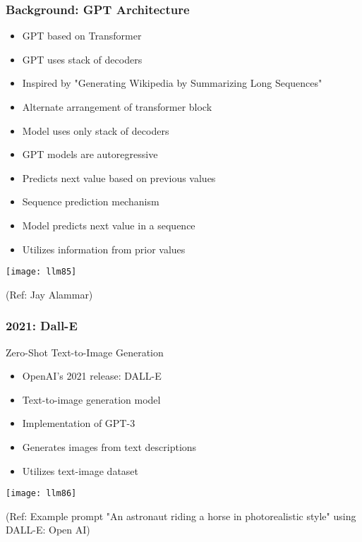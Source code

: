 \begin{frame}[fragile]\frametitle{Background: GPT Architecture}

\begin{itemize}
        \item GPT based on Transformer
        \item GPT uses stack of decoders
        \item Inspired by "Generating Wikipedia by Summarizing Long Sequences"
        \item Alternate arrangement of transformer block
        \item Model uses only stack of decoders
        \item GPT models are autoregressive
        \item Predicts next value based on previous values
        \item Sequence prediction mechanism
        \item Model predicts next value in a sequence
        \item Utilizes information from prior values		
\end{itemize}	

\begin{center}
\texttt{[image: llm85]}
\end{center}		

{\tiny (Ref: Jay Alammar)}

\end{frame}

\begin{frame}[fragile]\frametitle{2021: Dall-E}

 Zero-Shot Text-to-Image Generation
 
\begin{itemize}
        \item OpenAI's 2021 release: DALL-E
        \item Text-to-image generation model
        \item Implementation of GPT-3
        \item Generates images from text descriptions
        \item Utilizes text-image dataset	
\end{itemize}	

\begin{center}
\texttt{[image: llm86]}
\end{center}		

{\tiny (Ref: Example prompt "An astronaut riding a horse in photorealistic style" using DALL-E: Open AI)}

\end{frame}

